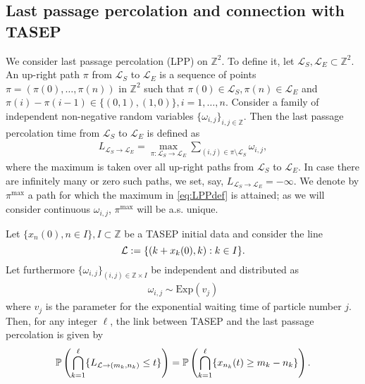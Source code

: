 \documentclass[12pt,a4paper]{article}
\numberwithin{equation}{section}
\newcommand{\Pb}{\mathbb{P}}
\newcommand{\Z}{\mathbb{Z}}
\begin{document}
\subsection{Last passage percolation and connection with TASEP}\label{Sec2Sub1}
We consider last passage percolation (LPP) on $\Z^2$. To define it, let $\mathcal{L}_S ,\mathcal{L}_E\subset \Z^2$. An up-right path $\pi$ from $\mathcal{L}_S$ to $\mathcal{L}_E$ is a sequence of points $\pi=(\pi(0),\ldots,\pi(n))$ in $\Z^{2}$ such that
 $\pi(0)\in \mathcal{L}_{S},\pi(n)\in \mathcal{L}_{E}$ and $\pi(i)-\pi(i-1)\in \{(0,1),(1,0)\},i=1,\ldots,n.$ Consider a family of independent non-negative random variables $\{\omega_{i,j}\}_{i,j\in \Z}.$
 Then the last passage percolation time from $\mathcal{L}_S$ to $\mathcal{L}_E$ is defined as
\begin{align}\label{eq:LPPdef}
L_{ \mathcal{L}_S \to \mathcal{L}_E}=\max_{\pi: \mathcal{L}_S\to \mathcal{L}_E}\sum_{(i,j)\in \pi\setminus \mathcal{L}_S}\omega_{i,j},
\end{align}
where the maximum is taken over all up-right paths from $\mathcal{L}_S$ to $\mathcal{L}_E$. In case there are infinitely many or zero such paths, we set, say, $L_{ \mathcal{L}_S \to \mathcal{L}_E}=-\infty$. We denote by $\pi^{\mathrm{max}}$ a path for which the maximum in \eqref{eq:LPPdef} is attained; as we will consider continuous $\omega_{i,j}$, $\pi^{\mathrm{max}}$ will be a.s. unique.

Let $\{x_{n}(0),n \in I\}, I \subset \Z$ be a TASEP initial data and consider the line
\begin{equation} \label{ell}
{\cal L}:= \{(k+x_k(0),k): k\in I\}.
\end{equation}
Let furthermore $\{\omega_{i,j}\}_{(i,j) \in \Z\times I}$ be independent and distributed as
\begin{align}\label{eq:RandomWeights}
\omega_{i,j}\sim \mbox{Exp}(v_j)
\end{align}
where $v_j$ is the parameter for the exponential waiting time of particle number $j.$
Then, for any integer $\ell$, the link between TASEP and the last passage percolation is given by
\begin{align}\label{eq:LPP&TASEPcoupling}
\Pb\left(\bigcap_{k=1}^\ell \{L_{{\cal L}\to (m_k,n_k)}\leq t\}\right)=\Pb\left(\bigcap_{k=1}^\ell \{x_{n_k}(t)\geq m_k-n_k\}\right).
\end{align}
\end{document}
